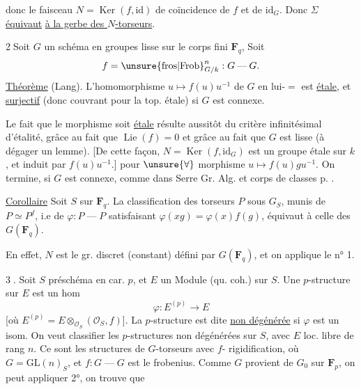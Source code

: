 donc le faisceau $N=\operatorname{Ker}(f,\mathrm{id})$ de coïncidence
de $f$ et de $\mathrm{id}_G$. Donc $\Sigma$ \uline{équivaut}
\uline{à la gerbe des $N$-torseurs}.

\textcircled{2}\quad Soit $G$ un schéma en groupes lisse  sur le
corps fini $\mathbf F_q$,  Soit
\[
f=\unsure{\mathrm{fros}|\mathrm{Frob}}^n_{G/k}:G\mathbin{\text{---}}G.
\]
\uline{Théorème} (Lang). L'homomorphisme $u\mapsto f(u)u^{-1}$ de $G$ en
lui-$=$ est \uline{étale}, et \uline{surjectif} (donc couvrant
pour la top. étale) si $G$ est connexe.

Le fait que le morphisme soit \uline{étale} résulte
aussitôt du critère infinitésimal d'étalité, grâce au fait
que  $\operatorname{Lie}(f)=0$ et grâce au fait que $G$
est lisse (à dégager un lemme). 
[De cette façon, $N=\operatorname{Ker}(f,\mathrm{id}_G)$ est un groupe étale
 sur $k$, et
induit par $f(u)u^{-1}$.]
 pour $\unsure{\forall}$
morphisme $u\mapsto f(u)g u^{-1}$. On termine, si $G$
est connexe, comme dans Serre Gr. Alg. et corps de classes
p. .



\uline{Corollaire} Soit $S$ sur $\mathbf F_q$. La classification des
torseurs $P$ sous $G_S$, munis de $P\simeq P^f$, i.e
de $\varphi:P\mathbin{\text{---}}P$ satisfaisant $\varphi(xg)=\varphi(x)f(g)$, équivaut
à celle des 
$G(\mathbf F_q)$.

En effet, $N$ est le gr. discret  (constant)
défini par $G(\mathbf F_q)$, et on applique le n° 1.

\textcircled{3}. Soit $S$ préschéma en car. $p$, et $E$ un
Module (qu. coh.) sur $S$. Une $p$-structure sur $E$
est un hom
\[
\varphi:E^{(p)}\longrightarrow E
\]
[où $E^{(p)}=E\otimes_{\mathcal O_S}(\mathcal O_S,f)$]. La $p$-structure est
dite \uline{non dégénérée} si $\varphi$ est un isom.
On veut classifier les $p$-structures non
dégénérées sur $S$, avec $E$ loc. libre de rang $n$.
Ce sont les structures de $G$-torseurs avec $f$-
rigidification, où $G=\mathrm{GL}(n)_S$, et $f:G\mathbin{\text{---}}G$
est le frobenius. Comme $G$ provient de
$G_0$ sur $\mathbf F_p$, on peut appliquer 2°, on trouve que


